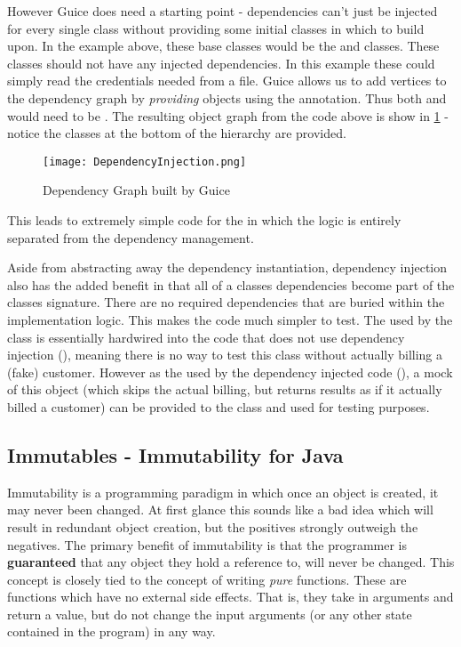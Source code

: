 However Guice does need a starting point - dependencies can't just be injected for every single class without providing some initial classes in which to build upon. In the example above, these base classes would be the  and  classes. These classes should not have any injected dependencies. In this example these could simply read the credentials needed from a file. Guice allows us to add vertices to the dependency graph by \textit{providing} objects using the  annotation. Thus both  and  would need to be . The resulting object graph from the code above is show in \ref{fig:depGraph} - notice the classes at the bottom of the hierarchy are provided. 

\begin{figure}[H]
      \centering
      \texttt{[image: DependencyInjection.png]}
      \caption{Dependency Graph built by Guice}
      \label{fig:depGraph}
\end{figure}

This leads to extremely simple code for the  in which the logic is entirely separated from the dependency management.



Aside from abstracting away the dependency instantiation, dependency injection also has the added benefit in that all of a classes dependencies become part of the classes signature. There are no required dependencies that are buried within the implementation logic. This makes the code much simpler to test. The  used by the class is essentially hardwired into the code that does not use dependency injection (), meaning there is no way to test this class without actually billing a (fake) customer. However as the  used by the dependency injected code (), a mock of this object (which skips the actual billing, but returns results as if it actually billed a customer) can be provided to the class and used for testing purposes.   

\subsection{Immutables - Immutability for Java}
Immutability is a programming paradigm in which once an object is created, it may never been changed. At first glance this sounds like a bad idea which will result in redundant object creation, but the positives strongly outweigh the negatives. The primary benefit of immutability is that the programmer is \textbf{guaranteed} that any object they hold a reference to, will never be changed. This concept is closely tied to the concept of writing \textit{pure} functions. These are functions which have no external side effects. That is, they take in arguments and return a value, but do not change the input arguments (or any other state contained in the program) in any way. 

